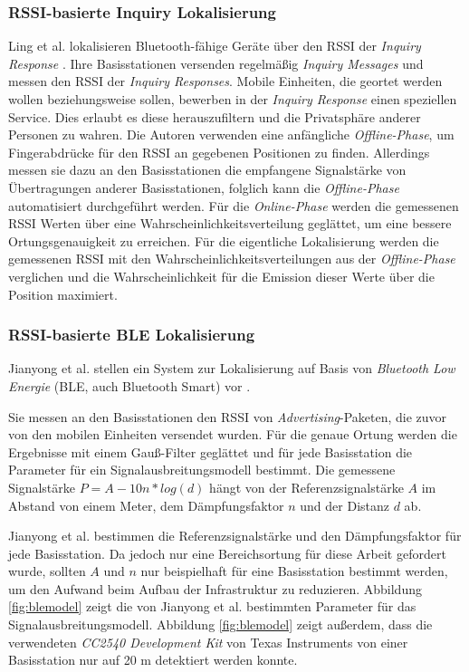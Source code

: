 \subsubsection{RSSI-basierte Inquiry Lokalisierung}
\label{ch:Vorherige:sec:inq}
Ling et al. lokalisieren Bluetooth-fähige Geräte über den RSSI der \emph{Inquiry Response} \cite{ling2010inquiry}.
Ihre Basisstationen versenden regelmäßig \emph{Inquiry Messages} und messen den RSSI der \emph{Inquiry Responses}.
Mobile Einheiten, die geortet werden wollen beziehungsweise sollen, bewerben in der \emph{Inquiry Response} einen speziellen Service.
Dies erlaubt es diese herauszufiltern und die Privatsphäre anderer Personen zu wahren.
Die Autoren verwenden eine anfängliche \emph{Offline-Phase}, um Fingerabdrücke für den RSSI an gegebenen Positionen zu finden.
Allerdings messen sie dazu an den Basisstationen die empfangene Signalstärke von Übertragungen anderer Basisstationen, folglich kann die \emph{Offline-Phase} automatisiert durchgeführt werden.
Für die \emph{Online-Phase} werden die gemessenen RSSI Werten über eine Wahrscheinlichkeitsverteilung geglättet, um eine bessere Ortungsgenauigkeit zu erreichen.
Für die eigentliche Lokalisierung werden die gemessenen RSSI mit den Wahrscheinlichkeitsverteilungen aus der \emph{Offline-Phase} verglichen und die Wahrscheinlichkeit für die Emission dieser Werte über die Position maximiert.

\subsubsection{RSSI-basierte BLE Lokalisierung}
\label{ch:Vorherige:sec:adv}
Jianyong et al. stellen ein System zur Lokalisierung auf Basis von \emph{Bluetooth Low Energie} (BLE, auch Bluetooth Smart) vor \cite{jianyong2014rssi}. 

Sie messen an den Basisstationen den RSSI von \emph{Advertising}-Paketen, die zuvor von den mobilen Einheiten versendet wurden.
Für die genaue Ortung werden die Ergebnisse mit einem Gauß-Filter geglättet und für jede Basisstation die Parameter für ein Signalausbreitungsmodell bestimmt.
Die gemessene Signalstärke $P = A - 10n*log(d)$ hängt von der Referenzsignalstärke $A$ im Abstand von einem Meter, dem Dämpfungsfaktor $n$ und der Distanz $d$ ab. 

Jianyong et al. bestimmen die Referenzsignalstärke und den Dämpfungsfaktor für jede Basisstation.
Da jedoch nur eine Bereichsortung für diese Arbeit gefordert wurde, sollten $A$ und $n$ nur beispielhaft für eine Basisstation bestimmt werden, um den Aufwand beim Aufbau der Infrastruktur zu reduzieren.
Abbildung \ref{fig:blemodel} zeigt die von Jianyong et al. bestimmten Parameter für das Signalausbreitungsmodell. 
Abbildung \ref{fig:blemodel} zeigt außerdem, dass die verwendeten \emph{CC2540 Development Kit} von Texas Instruments von einer Basisstation nur auf 20 m detektiert werden konnte.


